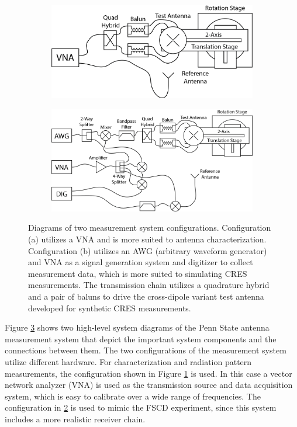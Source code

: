 \begin{figure}[htbp]
    \centering
    \begin{subfigure}[b]{0.43\textwidth}
        \centering
        \includegraphics[width=1\textwidth]{figs/Chapter-5/230409_vna_sys_diag.png}
        \caption{\label{fig:chap5-vna-meas-sys}}
    \end{subfigure}
    \hfill
    \begin{subfigure}[b]{0.52\textwidth}
        \centering
        \includegraphics[width=1\textwidth]{figs/Chapter-5/230408_detail_meas_sys_diag.png}
        \caption{\label{fig:chap5-dig-meas-sys}}
    \end{subfigure}
    \hfill
    \caption{\label{fig:meas-sys-diagrams}Diagrams of two measurement system configurations. Configuration (a) utilizes a VNA and is more suited to antenna characterization. Configuration (b) utilizes an AWG (arbitrary waveform generator) and VNA as a signal generation system and digitizer to collect measurement data, which is more suited to simulating CRES measurements. The transmission chain utilizes a quadrature hybrid and a pair of baluns to drive the cross-dipole variant test antenna developed for synthetic CRES measurements.}
\end{figure}

Figure \ref{fig:meas-sys-diagrams} shows two high-level system diagrams of the Penn State antenna measurement system that depict the important system components and the connections between them. The two configurations of the measurement system utilize different hardware. For characterization and radiation pattern measurements, the configuration shown in Figure \ref{fig:chap5-vna-meas-sys} is used. In this case a vector network analyzer (VNA) is used as the transmission source and data acquisition system, which is easy to calibrate over a wide range of frequencies. The configuration in \ref{fig:chap5-dig-meas-sys} is used to mimic the FSCD experiment, since this system includes a more realistic receiver chain. 

